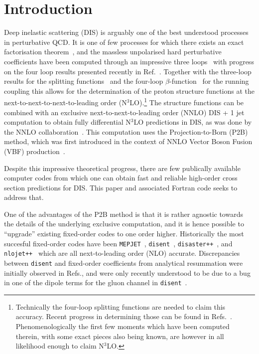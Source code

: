 \documentclass[submission, PhysCodeb]{SciPost}
\newcommand{\disent}{{\tt disent}}
\newcommand{\nnlojet}{NNLO{\sc{jet}}}
\newcommand{\disaster}{{\tt disaster++}}
\newcommand{\nlojet}{{\tt nlojet++}}
\newcommand{\NNNLO}{N$^3$LO}
\begin{document}
\section{Introduction}
\label{sec:intro}
Deep inelastic scattering (DIS) is arguably one of the best understood
processes in perturbative QCD. It is one of few processes for which
there exists an exact factorisation
theorem~\cite{Collins:1987pm,Collins:1989gx}, and the massless
unpolarised hard perturbative coefficients have been computed through
an impressive three
loops~\cite{SanchezGuillen:1990iq,vanNeerven:1991nn,Zijlstra:1992qd,Zijlstra:1992kj,vanNeerven:1999ca,vanNeerven:2000uj,Moch:1999eb,Moch:2004xu,Vermaseren:2005qc,Vogt:2006bt,Moch:2007rq,Davies:2016ruz,Blumlein:2022gpp}
with progress on the four loop results presented recently in
Ref.~\cite{Moch:2022frw}. Together with the three-loop results for the
splitting functions~\cite{Moch:2004pa,Vogt:2004mw} and the four-loop
$\beta$-function~\cite{vanRitbergen:1997va,Czakon:2004bu} for the
running coupling this allows for the determination of the proton
structure functions at the next-to-next-to-next-to-leading order
(\NNNLO{}).\footnote{Technically the four-loop splitting functions are
needed to claim this accuracy. Recent progress in determining those
can be found in
Refs.~\cite{Moch:2021qrk,Falcioni:2023luc,Falcioni:2023vqq,Gehrmann:2023cqm,Falcioni:2023tzp,Moch:2023tdj,Gehrmann:2023iah}. Phenomenologically
the first few moments which have been computed therein, with some
exact pieces also being known, are however in all likelihood enough to
claim \NNNLO{}. } The structure functions can be combined with an
exclusive next-to-next-to-leading order (NNLO) DIS + 1 jet computation
to obtain fully differential \NNNLO{} predictions in DIS, as was done
by the \nnlojet{}
collaboration~\cite{Currie:2018fgr,Gehrmann:2018odt}. This computation
uses the Projection-to-Born (P2B) method, which was first introduced
in the context of NNLO Vector Boson Fusion (VBF)
production~\cite{Cacciari:2015jma}.

Despite this impressive theoretical progress, there are few publically
available computer codes from which one can obtain fast and reliable
high-order cross section predictions for DIS. This paper and
associated Fortran code seeks to address that.

One of the advantages of the P2B method is that it is rather agnostic
towards the details of the underlying exclusive computation, and it is
hence possible to ``upgrade'' existing fixed-order codes to one order
higher. Historically the most succesful fixed-order codes have been
{\tt MEPJET}~\cite{Mirkes:1995ks}, \disent{}~\cite{Catani:1996vz},
\disaster{}~\cite{Graudenz:1997gv}, and \nlojet{}~\cite{Nagy:2001xb}
which are all next-to-leading order (NLO) accurate. Discrepancies
between \disent{} and fixed-order coefficients from analytical
resummation were initially observed in
Refs.\cite{Antonelli:1999kx,Dasgupta:2002dc}, and were only recently
understood to be due to a bug in one of the dipole terms for the gluon
channel in \disent{}~\cite{Borsa:2020ulb,Borsa:2020yxh}.
\end{document}
